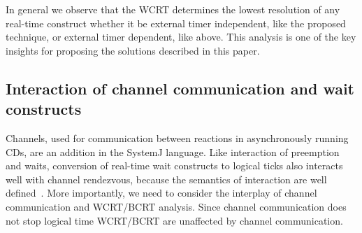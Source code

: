 In general we observe that the WCRT determines the lowest resolution of
any real-time construct whether it be external timer independent, like
the proposed technique, or external timer dependent, like above. This
analysis is one of the key insights for proposing the solutions
described in this paper.


\subsection{Interaction of channel communication and wait constructs}
\label{sec:inter-chann-comm}

Channels, used for communication between reactions in asynchronously
running CDs, are an addition in the SystemJ language. Like interaction
of preemption and waits, conversion of real-time wait constructs to
logical ticks also interacts well with channel rendezvous, because the
semantics of interaction are well defined~\cite{amal10}. More
importantly, we need to consider the interplay of channel communication
and WCRT/BCRT analysis. Since channel communication does not stop
logical time \cite{amal10} WCRT/BCRT are unaffected by channel
communication. 














